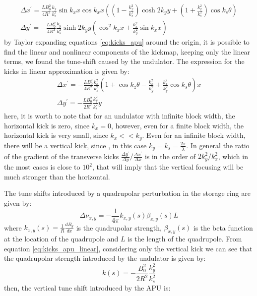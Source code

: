 \documentclass[a4paper,12pt]{article}
\begin{document}
\begin{equation}
    \begin{aligned}
        \Delta x^{\prime} = \frac{LB_0^2}{4R^2}\frac{k_x}{k_s^2}\sin{k_x x}\cos{k_x x}\left(\left(1-\frac{k_x^2}{k_s^2}\right)\cosh{2k_y y} + \left(1+\frac{k_x^2}{k_s^2}\right)\cos{k_s \theta}\right)\\
        \Delta y^{\prime} = -\frac{LB_0^2}{4R^2}\frac{k_y}{k_s^2}\sinh{2 k_y y}\left(\cos^2{k_x x} + \frac{k_x^2}{k_y^2}\sin{k_x x}\right)
    \end{aligned}
    \label{eq:kicks_apu}
\end{equation}
by Taylor expanding equations \ref{eq:kicks_apu} around the origin, it is possible to find the linear
 and nonlinear components of the kickmap, keeping only the linear terms, we found the tune-shift caused by the undulator.
 The expression for the kicks  in linear approximation is given by:
\begin{equation}
    \begin{aligned}
        \Delta x^{\prime} = -\frac{LB_0^2}{4R^2}\frac{k_x^2}{k_s^2}\left(1 + \cos{k_z\theta} - \frac{k_x^2}{k_y^2}+\frac{k_x^2}{k_y^2}\cos{k_s\theta}\right)x\\
        \Delta y^{\prime} = -\frac{LB_0^2}{2R^2}\frac{k_y^2}{k_s^2}y
    \end{aligned}
    \label{eq:kicks_apu_linear}
\end{equation}
here, it is worth to note that for an undulator with infinite block width, the horizontal kick is zero, since $k_x = 0$, however, even
for a finite block width, the horizontal kick is very small, since $k_x << k_y$. Even for an infinite block width, there will be a 
vertical kick, since , in this case $k_y = k_s = \frac{2 \pi}{\lambda}$. In general the ratio of the gradient of the transverse kicks 
$\frac{\Delta y^{\prime}}{\Delta y}/\frac{\Delta x^{\prime}}{\Delta x}$
is in the order of $2k_y^2/k_x^2$, which in the most cases is close to $10^2$, that will imply that the vertical focusing will be much stronger than
the horizontal.

The tune shifts introduced by a quadrupolar perturbation in the storage ring are given by: \cite{sands1970physics}
\begin{equation}
    \Delta \nu_{x, y} = -\frac{1}{4\pi} k_{x, y}(s)\beta_{x, y}(s)L
    \label{eq:tune_shift}
\end{equation}
where $k_{x, y}(s) = \frac{1}{R}\frac{dB_y}{dx}$ is the quadrupolar strength, $\beta_{x, y}(s)$ is the beta function at the location of the quadrupole and $L$ is the length of the quadrupole.
From equation \ref{eq:kicks_apu_linear}, considering only the vertical kick we can see that the quadrupolar strength introduced by the undulator is given by:
\begin{equation}
    k(s) = -\frac{B_0^2}{2R^2}\frac{k_y^2}{k_s^2}
    \label{eq:quadrupolar_strength}
\end{equation}
then, the vertical tune shift introduced by the APU is:
\end{document}
